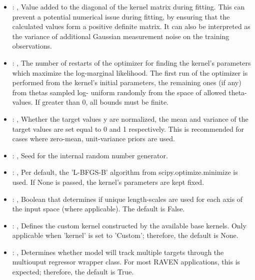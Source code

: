 \begin{itemize}
    \item {}: ,
      Value added to the diagonal of the kernel matrix during fitting. This can prevent a potential
      numerical issue during fitting, by ensuring that the calculated
      values form a positive definite matrix. It can also be interpreted as the variance of
      additional Gaussian measurement noise on the training observations.

    \item {}: ,
      The number of restarts of the optimizer for finding the kernel's parameters which maximize the
      log-marginal likelihood. The first run of the optimizer is performed
      from the kernel's initial parameters, the remaining ones (if any) from thetas sampled log-
      uniform randomly from the space of allowed theta-values. If greater than
      0, all bounds must be finite.

    \item {}: ,
      Whether the target values y are normalized, the mean and variance of the target values are set
      equal to 0 and 1 respectively. This is recommended for cases where zero-mean,
      unit-variance priors are used.

    \item {}: ,
      Seed for the internal random number generator.

    \item {}: ,
      Per default, the 'L-BFGS-B' algorithm from
      scipy.optimize.minimize is used. If None is passed, the kernel’s
      parameters are kept fixed.

    \item {}: ,
      Boolean that determines if unique length-scales are used for each
      axis of the input space (where applicable). The default is False.

    \item {}: ,
      Defines the custom kernel constructed by the available base kernels.
      Only applicable when 'kernel' is set to 'Custom'; therefore, the default is None.

    \item {}: ,
      Determines whether model will track multiple targets through the
      multiouput regressor wrapper class. For most RAVEN applications, this is expected;
      therefore, the default is True.
  \end{itemize}



